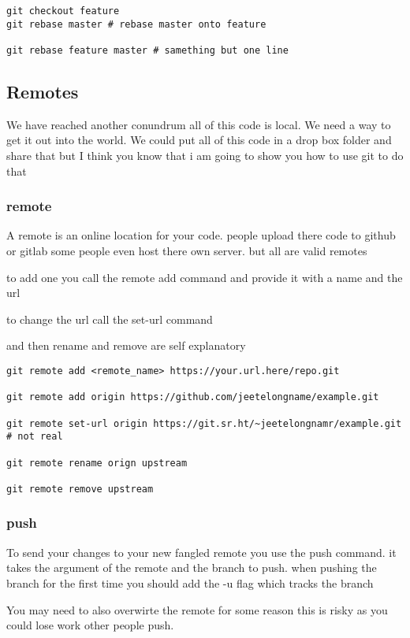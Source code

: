 \documentclass[a4paper]{article}
\begin{document}
\begin{verbatim}
git checkout feature
git rebase master # rebase master onto feature

git rebase feature master # samething but one line
\end{verbatim}

\subsection*{Remotes}
\label{sec:org1e144d5}
\begin{notes}
	We have reached another conundrum all of this code is local. We need a way to
	get it out into the world. We could put all of this code in a drop box folder
	and share that but I think you know that i am going to show you how to use git
	to do that
\end{notes}
\subsubsection*{remote}
\label{sec:org9b2103c}
\begin{notes}
	A remote is an online location for your code. people upload there code to github
	or gitlab some people even host there own server. but all are valid remotes

	to add one you call the remote add command and provide it with a name and the
	url

	to change the url call the set-url command

	and then rename and remove are self explanatory
\end{notes}

\begin{verbatim}
git remote add <remote_name> https://your.url.here/repo.git

git remote add origin https://github.com/jeetelongname/example.git

git remote set-url origin https://git.sr.ht/~jeetelongnamr/example.git # not real

git remote rename orign upstream

git remote remove upstream
\end{verbatim}

\subsubsection*{push}
\label{sec:org4fba459}
\begin{notes}
	To send your changes to your new fangled remote you use the push command. it
	takes the argument of the remote and the branch to push. when pushing the branch
	for the first time you should add the -u flag which tracks the branch

	You may need to also overwirte the remote for some reason this is risky as you
	could lose work other people push.
\end{notes}
\end{document}
